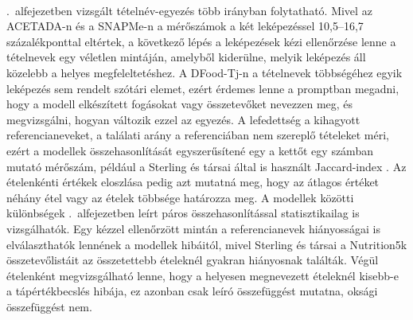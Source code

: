 \paragraph{}\Az{\ref{sec:felismeres}}.~alfejezetben vizsgált tételnév-egyezés több irányban folytatható. 
Mivel az ACETADA-n és a SNAPMe-n a mérőszámok 
a két leképezéssel 10,5--16,7 százalékponttal eltértek, a következő lépés a leképezések kézi ellenőrzése lenne a tételnevek egy véletlen mintáján, amelyből kiderülne, melyik leképezés áll közelebb a helyes megfeleltetéshez. A DFood-Tj-n a 
tételnevek többségéhez egyik leképezés sem rendelt szótári elemet, ezért érdemes lenne a promptban megadni, hogy a modell 
elkészített fogásokat vagy összetevőket nevezzen meg, és megvizsgálni, hogyan változik ezzel az egyezés. A lefedettség a 
kihagyott referencianeveket, a találati arány a referenciában nem szereplő tételeket méri, ezért a modellek összehasonlítását 
egyszerűsítené egy a kettőt egy számban mutató mérőszám, például a Sterling és társai által is használt Jaccard-index \cite{sterling2026vlm}. 
Az ételenkénti értékek eloszlása pedig azt mutatná meg, hogy az átlagos értéket néhány étel vagy az ételek többsége határozza meg. 
A modellek közötti különbségek \az{\ref{sec:ertekeles}}.~alfejezetben leírt páros összehasonlítással statisztikailag is 
vizsgálhatók. Egy kézzel ellenőrzött mintán a referencianevek hiányosságai is elválaszthatók lennének a modellek hibáitól, mivel 
Sterling és társai a Nutrition5k összetevőlistáit az összetettebb ételeknél gyakran hiányosnak találták. Végül ételenként 
megvizsgálható lenne, hogy a helyesen megnevezett ételeknél kisebb-e a tápértékbecslés hibája, ez azonban csak leíró 
összefüggést mutatna, oksági összefüggést nem.

